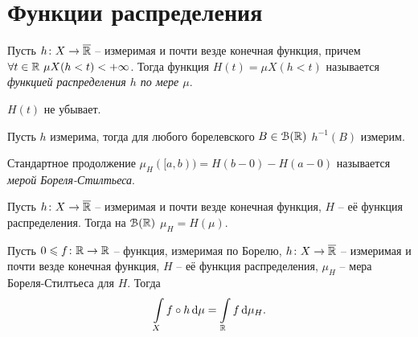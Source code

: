 \section{Функции распределения}

\begin{definition}
    Пусть $h \colon X \to \overline{\mathbb{R}}$ -- измеримая и почти везде конечная функция,
    причем $\forall t \in \mathbb{R}~ \mu X(h < t) < +\infty$. Тогда
    функция $H(t) = \mu X(h < t)$ называется \textit{функцией распределения
    $h$ по мере $\mu$}.
\end{definition}

\begin{remark}
    $H(t)$ не убывает.
\end{remark}

\begin{remark}
    Пусть $h$ измерима, тогда для любого борелевского $B \in \mathcal{B}(\mathbb{R})$ $h^{-1}(B)$ измерим.
\end{remark}

\begin{definition}
    Стандартное продолжение $\mu_H([a, b)) = H(b - 0) - H(a - 0)$
    называется \textit{мерой Бореля-Стилтьеса}.
\end{definition}


\begin{lemma}
    Пусть $h \colon X \to \overline{\mathbb{R}}$ -- измеримая и почти везде конечная функция, $H$
    -- её функция распределения. Тогда на $\mathcal{B}(\mathbb{R})$ $\mu_H = H(\mu)$.
\end{lemma}

\begin{theorem}
    Пусть $0 \leqslant f \colon \mathbb{R} \to \mathbb{R}$ -- функция, измеримая по Борелю,
    $h \colon X \to \overline{\mathbb{R}}$ -- измеримая и почти везде конечная функция,
    $H$ -- её функция распределения, $\mu_H$ -- мера Бореля-Стилтьеса для $H$.
    Тогда
\[
    \int\limits_{X}{f \circ h \,\mathrm{d}\mu} = \int\limits_{\mathbb{R}}{f \,\mathrm{d}\mu_H}
.\] 
\end{theorem}


